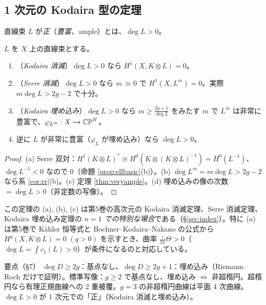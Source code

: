 \subsection{1 次元の Kodaira 型の定理}
\begin{defn}
直線束 $L$ が\emph{正}（\emph{豊富}、ample）とは、$\deg L>0$。
\end{defn}
\begin{thm}\label{thm:kodaira1}
$L$ を $X$ 上の直線束とする。
\begin{enumerate}
\item[(a)] （\emph{Kodaira 消滅}）$\deg L>0$ なら $H^1(X,K\otimes L)=0$。
\item[(b)] （\emph{Serre 消滅}）$\deg L>0$ なら $m\gg0$ で $H^1(X,L^m)=0$。実際 $m\deg L>2g-2$ で十分。
\item[(c)] （\emph{Kodaira 埋め込み}）$\deg L>0$ なら $m\ge\frac{2g+1}{\deg L}$ をみたす $m$ で $L^m$ は非常に豊富で、$\varphi_{L^m}:X\hookrightarrow\mathbb{CP}^N$。
\item[(d)] 逆に $L$ が非常に豊富（$\varphi_L$ が埋め込み）なら $\deg L>0$。
\end{enumerate}
\end{thm}
\begin{proof}
(a) Serre 双対：$H^1(K\otimes L)^*\cong H^0(K\otimes(K\otimes L)^{-1})=H^0(L^{-1})$、$\deg L^{-1}<0$ なので $0$（命題 \ref{prop:ellbasic}(b)）。(b) $\deg L^m=m\deg L>2g-2$ なら系 \ref{cor:rr}(b)。(c) 定理 \ref{thm:veryample}。(d) 埋め込みの像の次数 $=\deg L>0$（非定数の写像）。 
\end{proof}
この定理の (a), (b), (c) は第5巻の高次元の Kodaira 消滅定理、Serre 消滅定理、Kodaira 埋め込み定理の \emph{$n=1$ での特別な場合}である（\S\ref{sec:index}）。特に (a) は第5巻で Kähler 恒等式と Bochner--Kodaira--Nakano の公式から $H^q(X,K\otimes L)=0$ $(q>0)$ を示すとき、曲率 $\frac i{2\pi}\Theta>0$（$\deg L=\int c_1(L)>0$）が条件になるのと対応している。

\begin{keybox}{要点（§7）}
$\deg D\ge2g$：基点なし、$\deg D\ge2g+1$：埋め込み（Riemann--Roch だけで証明）。標準写像：$g\ge2$ で基点なし、埋め込み $\iff$ 非超楕円。超楕円なら有理正規曲線への 2 重被覆。$g=3$ の非超楕円曲線は平面 4 次曲線。$\deg L>0$ が 1 次元での「正」（Kodaira 消滅と埋め込み）。
\end{keybox}

